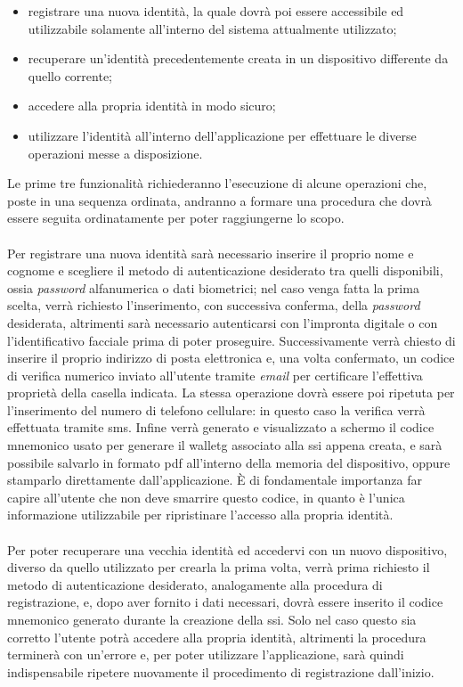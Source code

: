 \begin{itemize}
	\item registrare una nuova identità, la quale dovrà poi essere accessibile ed utilizzabile solamente all'interno del sistema attualmente utilizzato;
	\item recuperare un'identità precedentemente creata in un dispositivo differente da quello corrente;
	\item accedere alla propria identità in modo sicuro;
	\item utilizzare l'identità all'interno dell'applicazione per effettuare le diverse operazioni messe a disposizione.
\end{itemize}
Le prime tre funzionalità richiederanno l'esecuzione di alcune operazioni che, poste in una sequenza ordinata, andranno a formare una procedura che dovrà essere seguita ordinatamente per poter raggiungerne lo scopo.\\\\
Per registrare una nuova identità sarà necessario inserire il proprio nome e cognome e scegliere il metodo di autenticazione desiderato tra quelli disponibili, ossia \textit{password} alfanumerica o dati biometrici; nel caso venga fatta la prima scelta, verrà richiesto l'inserimento, con successiva conferma, della \textit{password} desiderata, altrimenti sarà necessario autenticarsi con l'impronta digitale o con l'identificativo facciale prima di poter proseguire. Successivamente verrà chiesto di inserire il proprio indirizzo di posta elettronica e, una volta confermato, un codice di verifica numerico inviato all'utente tramite \textit{email} per certificare l'effettiva proprietà della casella indicata. La stessa operazione dovrà essere poi ripetuta per l'inserimento del numero di telefono cellulare: in questo caso la verifica verrà effettuata tramite \gls{sms}\glsfirstoccur. Infine verrà generato e visualizzato a schermo il codice mnemonico usato per generare il \gls{walletg} associato alla \gls{ssi} appena creata, e sarà possibile salvarlo in formato \gls{pdf}\glsfirstoccur{} all'interno della memoria del dispositivo, oppure stamparlo direttamente dall'applicazione. È di fondamentale importanza far capire all'utente che non deve smarrire questo codice, in quanto è l'unica informazione utilizzabile per ripristinare l'accesso alla propria identità.\\\\
Per poter recuperare una vecchia identità ed accedervi con un nuovo dispositivo, diverso da quello utilizzato per crearla la prima volta, verrà prima richiesto il metodo di autenticazione desiderato, analogamente alla procedura di registrazione, e, dopo aver fornito i dati necessari, dovrà essere inserito il codice mnemonico generato durante la creazione della \gls{ssi}. Solo nel caso questo sia corretto l'utente potrà accedere alla propria identità, altrimenti la procedura terminerà con un'errore e, per poter utilizzare l'applicazione, sarà quindi indispensabile ripetere nuovamente il procedimento di registrazione dall'inizio.\\\\
